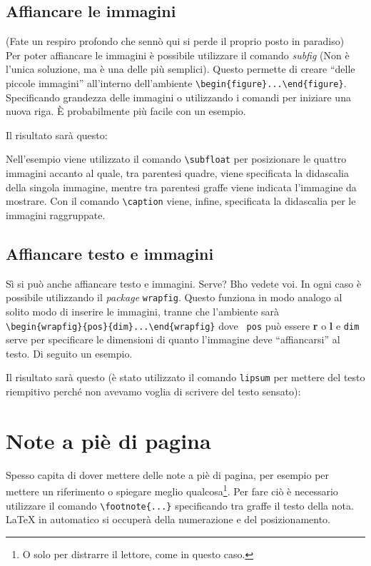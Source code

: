 \subsection{Affiancare le immagini}
(Fate un respiro profondo che sennò qui si perde il proprio posto in paradiso) 
\\
Per poter affiancare le immagini è possibile utilizzare il comando
\textit{subfig} (Non è l'unica soluzione, ma è una delle più semplici).
Questo permette di creare ``delle piccole immagini'' all'interno dell'ambiente 
\verb!\begin{figure}...\end{figure}!. Specificando grandezza delle immagini o 
utilizzando i comandi per iniziare una nuova riga. È probabilmente più facile 
con un esempio.

Il risultato sarà questo:

Nell'esempio viene utilizzato il comando \verb!\subfloat! per posizionare le 
quattro immagini accanto al quale, tra parentesi quadre, viene specificata la 
didascalia della singola immagine, mentre tra parentesi graffe viene indicata 
l'immagine da mostrare. Con il comando \verb!\caption! viene, infine, 
specificata la didascalia per le immagini raggruppate.

\subsection{Affiancare testo e immagini}
Sì si può anche affiancare testo e immagini. Serve? Bho vedete voi. In ogni 
caso è possibile utilizzando il \textit{package} \verb!wrapfig!. Questo 
funziona in modo analogo al solito modo di inserire le immagini, tranne che 
l'ambiente sarà \\
\verb!\begin{wrapfig}{pos}{dim}...\end{wrapfig}! dove \texttt{
pos} può essere \textbf{r} o \textbf{l} e \texttt{dim} serve per specificare 
le dimensioni di quanto l'immagine deve ``affiancarsi'' al testo. Di seguito 
un esempio. 

Il risultato sarà questo (è stato utilizzato il comando \texttt{lipsum} per 
mettere del testo riempitivo perché non avevamo voglia di scrivere del testo 
sensato):
\newpage

\newpage

\section{Note a piè di pagina}
Spesso capita di dover mettere delle note a piè di pagina, per esempio per 
mettere un riferimento o spiegare meglio qualcosa\footnote{O solo per 
distrarre il lettore, come in questo caso.}. Per fare ciò è necessario 
utilizzare il comando \verb!\footnote{...}! specificando tra graffe il testo 
della nota. \LaTeX{} in automatico si occuperà della numerazione e del 
posizionamento.



